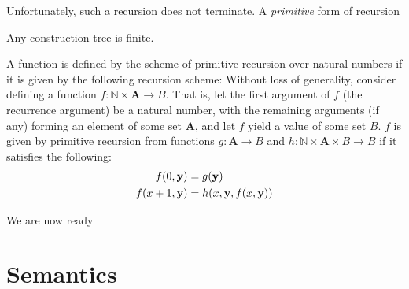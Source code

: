 Unfortunately, such a recursion does not terminate. A \emph{primitive} form of recursion 

Any construction tree is finite.

A function is defined by the scheme of primitive recursion over natural numbers
if it is given by the following recursion scheme: Without loss of generality,
consider defining a function $f : \mathbb{N} \times \mathbf{A} \rightarrow B$.
That is, let the first argument of $f$ (the recurrence argument) be a natural
number, with the remaining arguments (if any) forming an element of some set
$\mathbf{A}$, and let $f$ yield a value of some set $B$. $f$ is given by
primitive recursion from functions $g : \mathbf{A} \rightarrow B$ and $h :
\mathbb{N} \times \mathbf{A} \times B \rightarrow B$ if it satisfies the
following: \begin{align*}
%
f\p{0, \mathbf{y}} &= g\p{\mathbf{y}}\\
%
f\p{x+1, \mathbf{y}} &= h\p{x,\mathbf{y},f\p{x,\mathbf{y}}}
%
\end{align*}

We are now ready 







\section{Semantics}

